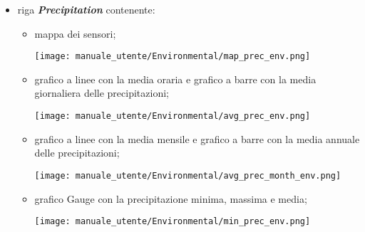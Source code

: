 \begin{itemize}
    \item riga \textit{\textbf{Precipitation}} contenente:
    \begin{itemize}
        \item mappa dei sensori;
        \begin{center}
            \texttt{[image: manuale\_utente/Environmental/map\_prec\_env.png]}
        \end{center}
        \item grafico a linee con la media oraria e grafico a barre con la media giornaliera delle precipitazioni;
        \begin{center}
            \texttt{[image: manuale\_utente/Environmental/avg\_prec\_env.png]}
        \end{center}
        \item grafico a linee con la media mensile e grafico a barre con la media annuale delle precipitazioni;
        \begin{center}
            \texttt{[image: manuale\_utente/Environmental/avg\_prec\_month\_env.png]}
        \end{center}
        \item grafico Gauge con la precipitazione minima, massima e media;
        \begin{center}
            \texttt{[image: manuale\_utente/Environmental/min\_prec\_env.png]}
        \end{center}
    \end{itemize}


\end{itemize}
